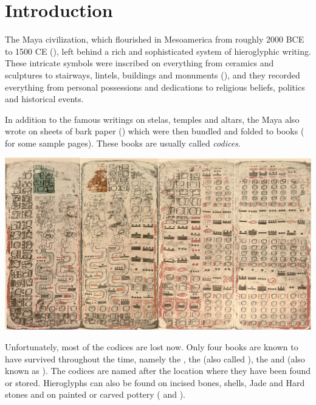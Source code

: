 \documentclass[../main.tex]{subfiles}
\begin{document}
\chapter{Introduction}
The Maya civilization, which flourished in Mesoamerica from roughly 2000 BCE to 1500 CE 
(\cite[3]{estrada-belli2011}), 
left behind a rich and sophisticated system of hieroglyphic writing. 
These intricate symbols were inscribed on everything from ceramics and sculptures to stairways,
lintels, buildings and monuments (\cite[\ppno~17--27]{thompson1962}), and they recorded everything 
from personal possessions and dedications to religious beliefs, politics and historical events.

In addition to the famous writings on stelas, temples and altars, the Maya also wrote on sheets of 
bark paper (\cite[34\psq]{vonhagen1944}) which were then bundled and 
folded to books ( for some sample pages).
These books are usually called \emph{codices}.
\begin{center}
    \includegraphics[width=\textwidth,keepaspectratio]{img/example-dresden-codex}
    \label{fig:introduction-example-dresden-codex}
\end{center}
Unfortunately, most of the codices are lost now.
Only four books are known to have survived throughout the time, 
namely the \dresdencodex, the \madridcodex (also called \troanocodex),
the \pariscodex and \mayamexicocodex(also known as \groliercodex).
The codices are named after the location where they have been found or stored.
Hieroglyphs can also be found on incised bones, shells, Jade and Hard stones and on painted or 
carved pottery ( and
).
\end{document}
